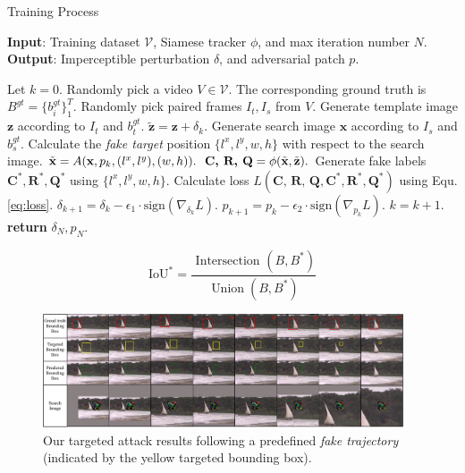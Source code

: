 \documentclass[journal]{IEEEtran}
\begin{document}
\begin{algorithm}[tb]
  \caption{Training Process}
  \label{alg:algorithm}
  \textbf{Input}: Training dataset $\mathcal{V}$, Siamese tracker $\phi$, and max iteration number $N$.\\
  \textbf{Output}: Imperceptible perturbation $\delta$, and adversarial patch $p$.
  \begin{algorithmic}[1] %
  \STATE Let $k = 0$.
  \STATE Randomly pick a video $V\in \mathcal{V}$. The corresponding ground truth is $B^{gt}=\{b^{gt}_i\}^T_1$.
  \STATE Randomly pick paired frames $I_t, I_s$ from $V$.
  \STATE Generate template image $\textbf{z}$ according to $I_t$ and $b^{gt}_t$.
  \STATE $\tilde{\textbf{z}} = \textbf{z} + \delta_k.$
  \STATE Generate search image $\textbf{x}$ according to $I_s$ and $b^{gt}_s$.
  \STATE Calculate the \textit{fake target} position $\{l^x, l^y, w, h\}$ with respect to the search image.
  \STATE $\tilde{\textbf x} = A(\textbf x, p_k, (l^x, l^y), (w, h)).$
  \STATE $\textbf{C, R, Q} = \phi(\tilde {\textbf x}, \tilde{\textbf z}).$
  \STATE Generate fake labels $\textbf{C}^*,\textbf{R}^*,\textbf{Q}^*$ using $\{l^x, l^y, w, h\}$.
  \STATE Calculate loss $L(\textbf{C, R, Q}, \textbf{C}^*, \textbf{R}^*, \textbf{Q}^*)$ using Equ. \ref{eq:loss}.
  \STATE $\delta_{k+1} = \delta_{k} - \epsilon_1 \cdot \text{sign}(\nabla_{\delta_k}L).$
  \STATE $p_{k+1} = p_{k} - \epsilon_2 \cdot \text{sign}(\nabla_{p_k}L).$
  \STATE $k = k + 1.$
  \ENDWHILE
  \STATE \textbf{return} $\delta_N, p_N.$
  \end{algorithmic}
  \label{alg}
\end{algorithm}

\begin{equation}
  \mathrm{IoU}^{*}=\frac{\text { Intersection }\left(B, B^{*}\right)}{\operatorname{Union}\left(B, B^{*}\right)}
\end{equation}  

\begin{figure}[t]
  \centering
  \includegraphics[width=0.95\textwidth]{images/vis_v4.pdf}
  \caption{Our targeted attack results following a predefined \textit{fake trajectory} (indicated by the yellow targeted bounding box).}
  \label{fig:vis}
\end{figure}
\end{document}
